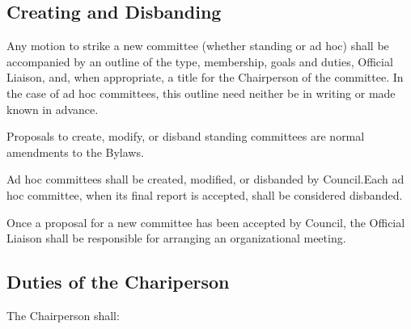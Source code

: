 \subsection{Creating and Disbanding}
\begin{longenum}[ label*=\thesubsection.\arabic*., align=left]
	\item Any motion to strike a new committee (whether standing or ad hoc) shall be accompanied by an outline of the type, membership, goals and duties, Official Liaison, and, when appropriate, a title for the Chairperson of the committee. In the case of ad hoc committees, this outline need neither be in writing or made known in advance. 
    \item Proposals to create, modify, or disband standing committees are normal amendments to the Bylaws.
    \item Ad hoc committees shall be created, modified, or disbanded by Council.Each ad hoc committee, when its final report is accepted, shall be considered disbanded.
    \item Once a proposal for a new committee has been accepted by Council, the Official Liaison shall be responsible for arranging an organizational meeting. 
\end{longenum}

\subsection{Duties of the Chariperson}
The Chairperson shall:

